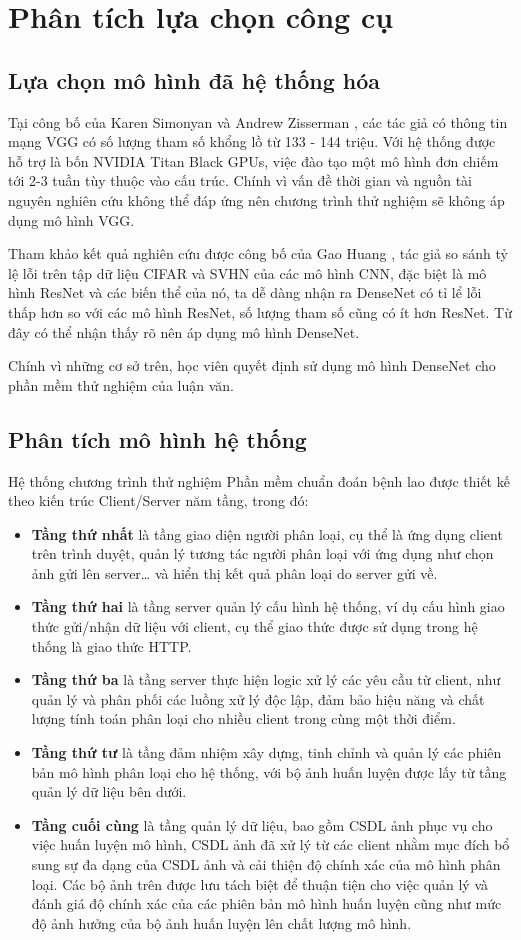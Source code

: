 \section{Phân tích lựa chọn công cụ}
\subsection{Lựa chọn mô hình đã hệ thống hóa}
Tại công bố của Karen Simonyan và Andrew Zisserman \cite{vgg16}, các tác giả có thông tin mạng VGG có số lượng tham số khổng lồ từ 133 - 144 triệu. Với hệ thống được hỗ trợ là bốn NVIDIA Titan Black GPUs, việc đào tạo một mô hình đơn chiếm tới 2-3 tuần tùy thuộc vào cấu trúc. Chính vì vấn đề thời gian và nguồn tài nguyên nghiên cứu không thể đáp ứng nên chương trình thử nghiệm sẽ không áp dụng mô hình VGG.
 
Tham khảo kết quả nghiên cứu được công bố của Gao Huang \cite{densenet}, tác giả so sánh tỷ lệ lỗi trên tập dữ liệu CIFAR và SVHN của các mô hình CNN, đặc biệt là mô hình ResNet và các biến thể của nó, ta dễ dàng nhận ra DenseNet có tỉ lể lỗi thấp hơn so với các mô hình ResNet, số lượng tham số cũng có ít hơn ResNet. Từ đây có thể nhận thấy rõ nên áp dụng mô hình DenseNet.

Chính vì những cơ sở trên, học viên quyết định sử dụng mô hình DenseNet cho phần mềm thử nghiệm của luận văn.

\subsection{Phân tích mô hình hệ thống}
Hệ thống chương trình thử nghiệm Phần mềm chuẩn đoán bệnh lao được thiết kế theo kiến trúc Client/Server năm tầng, trong đó:
\begin{itemize}
	\item {\bf Tầng thứ nhất} là tầng giao diện người phân loại, cụ thể là ứng dụng client trên trình duyệt, quản lý tương tác người phân loại với ứng dụng như chọn ảnh gửi lên server… và hiển thị kết quả phân loại do server gửi về.
	\item {\bf Tầng thứ hai} là tầng server quản lý cấu hình hệ thống, ví dụ cấu hình giao thức gửi/nhận dữ liệu với client, cụ thể giao thức được sử dụng trong hệ thống là giao thức HTTP.
	\item {\bf Tầng thứ ba} là tầng server thực hiện logic xử lý các yêu cầu từ client, như	quản lý và phân phối các luồng xử lý độc lập, đảm bảo hiệu năng và chất lượng tính toán phân loại cho nhiều client trong cùng một thời điểm.
	\item {\bf Tầng thứ tư} là tầng đảm nhiệm xây dựng, tinh chỉnh và quản lý các phiên	bản mô hình phân loại cho hệ thống, với bộ ảnh huấn luyện được lấy từ tầng quản lý dữ liệu bên dưới.
	\item {\bf Tầng cuối cùng} là tầng quản lý dữ liệu, bao gồm CSDL ảnh phục vụ cho việc huấn luyện mô hình, CSDL ảnh đã xử lý từ các client nhằm mục đích bổ sung sự	đa dạng của CSDL ảnh và cải thiện độ chính xác của mô hình phân loại. Các bộ ảnh trên được lưu tách biệt để thuận tiện cho việc quản lý và đánh giá độ chính xác của các
	phiên bản mô hình huấn luyện cũng như mức độ ảnh hưởng của bộ ảnh huấn luyện lên chất lượng mô hình.
\end{itemize}


